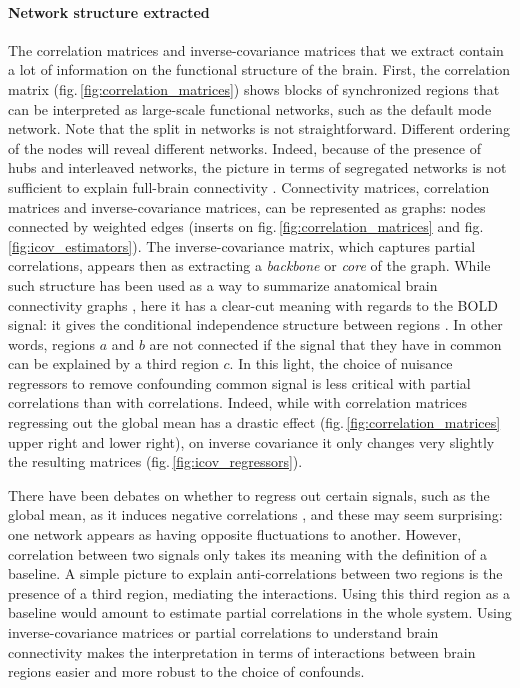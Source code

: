 \documentclass[5p]{elsarticle}
\begin{document}

\paragraph{Network structure extracted}
%
The correlation matrices and inverse-covariance matrices that we extract
contain a lot of information on the functional structure of the brain.
First, the correlation matrix (fig.\,\ref{fig:correlation_matrices})
shows blocks of synchronized regions that can be interpreted as
large-scale functional networks, such as the default mode network. Note
that the split in networks is not straightforward. Different ordering of the
nodes will reveal different networks. 
Indeed, because of the presence of
hubs and interleaved networks, the picture in terms of segregated networks
is not sufficient to explain full-brain connectivity
\cite{varoquaux2012}. Connectivity matrices, correlation matrices and
inverse-covariance matrices, can be represented as graphs: nodes connected
by weighted edges (inserts on fig.\,\ref{fig:correlation_matrices} and
fig.\,\ref{fig:icov_estimators}). The inverse-covariance matrix, which
captures partial correlations, appears then as extracting a
\emph{backbone} or \emph{core} of the graph.
While such structure has
been used as a way to summarize anatomical brain connectivity graphs
\cite{hagmann2008}, here it has a clear-cut meaning with regards to
the BOLD signal: it gives the conditional independence structure between
regions \cite{varoquaux2012}. In other words, regions $a$ and $b$ are
not connected if the signal that they have in common can be explained by
a third region $c$. In this light, the choice of nuisance regressors to
remove confounding common signal is less critical with partial
correlations than with correlations. Indeed, while with
correlation matrices regressing out the global mean has a drastic effect
(fig.\,\ref{fig:correlation_matrices} upper right and lower right), on
inverse covariance it only changes very slightly the resulting matrices
(fig.\,\ref{fig:icov_regressors}).

There have been debates on whether to
regress out certain signals, such as the global mean,  as it induces
negative correlations \cite{murphy2009,chang2009,fox2009}, and these may seem
surprising: one network appears as having opposite fluctuations to
another. However,
correlation between two signals only takes its meaning with the
definition of a baseline. A simple picture to explain anti-correlations
between two regions is the presence of a third region, mediating the
interactions. Using this third region as a baseline would amount to
estimate partial correlations in the whole system. Using 
inverse-covariance matrices or partial correlations to understand brain
connectivity makes the interpretation in terms of interactions between
brain regions easier and more robust to the choice of confounds.
\end{document}
